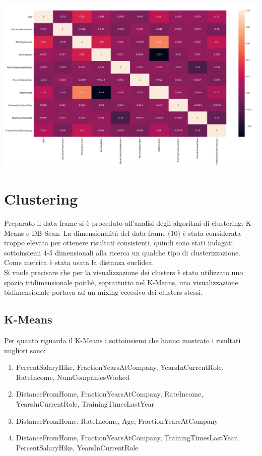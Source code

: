 \documentclass[a4paper,9pt]{article}
\begin{document}
\begin{center}
\includegraphics[scale=1.2]{macnum.png}
\end{center}

\section{Clustering}
Preparato il data frame si è proceduto all'analisi degli algoritmi di clustering: K-Means e DB Scan. La dimensionalità del data frame ($10$) è stata considerata troppo elevata per ottenere risultati consistenti, quindi sono stati indagati sottoinsiemi 4-5 dimensionali alla ricerca un qualche tipo di clusterizzazione. Come metrica è stata usata la distanza euclidea.\\
Si vuole precisare che per la visualizzazione dei clusters è stato utilizzato uno spazio tridimensionale poichè, soprattutto nel K-Means, una visualizzazione bidimensionale portava ad un mixing eccesivo dei clusters stessi.
\subsection{K-Means}
Per quanto riguarda il K-Means i sottoinsiemi che hanno mostrato i risultati migliori sono:\\

\begin{enumerate}
\item PercentSalaryHike, FractionYearsAtCompany, YearsInCurrentRole, RateIncome, NumCompaniesWorked
\item DistanceFromHome, FractionYearsAtCompany, RateIncome, YearsInCurrentRole, TrainingTimesLastYear
\item DistanceFromHome, RateIncome, Age, FractionYearsAtCompany
\item DistanceFromHome, FractionYearsAtCompany, TrainingTimesLastYear, PercentSalaryHike, YearsInCurrentRole
\end{enumerate}
\end{document}
